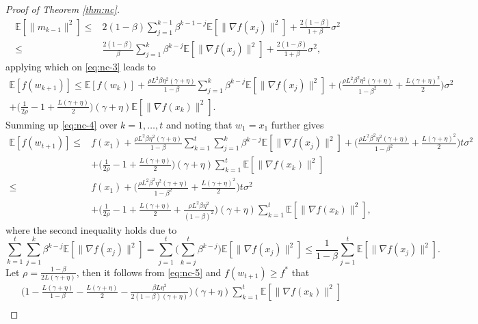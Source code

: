 \documentclass[10pt]{article}
\numberwithin{equation}{section}
\theoremstyle{definition}
\newcommand{\ebb}{\mathbb{E}}  %
\begin{document}
\begin{proof}[Proof of Theorem \ref{thm:nc}]
\begin{align*}
   \ebb[\|m_{k-1}\|^2]\leq& 2(1-\beta) \sum_{j=1}^{k-1} \beta^{k-1-j}\ebb[\|\nabla f(x_j)\|^2]+\frac{2(1-\beta)}{1+\beta} \sigma^2\\
   \leq& \frac{2(1-\beta)}{\beta}\sum_{j=1}^k \beta^{k-j}\ebb[\|\nabla f(x_j)\|^2]+\frac{2(1-\beta)}{1+\beta} \sigma^2,
\end{align*}
applying which on \eqref{eq:nc-3} leads to
\begin{multline}\label{eq:nc-4}
\ebb[f(w_{k+1})] \leq \ebb[f(w_k)]+\frac{\rho L^2 \beta \eta^2 (\gamma+\eta)}{1-\beta} \sum_{j=1}^k \beta^{k-j} \ebb[\|\nabla f(x_j)\|^2]+\Big(\frac{\rho L^2 \beta^2 \eta^2(\gamma+\eta)}{1-\beta^2}+\frac{L(\gamma+\eta)^2}{2}\Big) \sigma^2 \\
+\Big(\frac{1}{2 \rho}-1+\frac{L(\gamma+\eta)}{2}\Big)(\gamma+\eta) \ebb[\|\nabla f(x_k)\|^2].
\end{multline}
Summing up \eqref{eq:nc-4} over $k=1,\dots, t$ and noting that $w_1=x_1$ further gives
\begin{equation}\label{eq:nc-5}
\begin{aligned}
\ebb[f(w_{t+1})] \leq & f(x_1)+\frac{\rho L^2 \beta \eta^2 (\gamma+\eta)}{1-\beta}\sum_{k=1}^t\sum_{j=1}^k \beta^{k-j} \ebb[\|\nabla f(x_j)\|^2]+\Big(\frac{\rho L^2 \beta^2\eta^2 (\gamma+\eta)}{1-\beta^2}+\frac{L(\gamma+\eta)^2}{2}\Big) t \sigma^2 \\
& +\Big(\frac{1}{2 \rho}-1+\frac{L(\gamma+\eta)}{2}\Big)(\gamma+\eta) \sum_{k=1}^t \ebb[\|\nabla f(x_k)\|^2]\\
\leq & f(x_1)+\Big(\frac{\rho L^2 \beta^2\eta^2 (\gamma+\eta)}{1-\beta^2}+\frac{L(\gamma+\eta)^2}{2}\Big) t \sigma^2 \\
& +\Big(\frac{1}{2 \rho}-1+\frac{L(\gamma+\eta)}{2}+\frac{\rho L^2 \beta \eta^2}{(1-\beta)^2}\Big)(\gamma+\eta) \sum_{k=1}^t \ebb[\|\nabla f(x_k)\|^2],
\end{aligned}
\end{equation}
where the second inequality holds due to
\[
\sum_{k=1}^t\sum_{j=1}^k \beta^{k-j} \ebb[\|\nabla f(x_j)\|^2]=\sum_{j=1}^t\Big(\sum_{k=j}^t \beta^{k-j}\Big) \ebb[\|\nabla f(x_j)\|^2]\leq \frac{1}{1-\beta}\sum_{j=1}^t \ebb[\|\nabla f(x_j)\|^2].
\]
Let $\rho=\frac{1-\beta}{2 L(\gamma+\eta)}$, then it follows from \eqref{eq:nc-5} and $f(w_{t+1})\ge f^*$ that
\begin{equation}\label{eq:nc-6}
\begin{aligned}
& \Big(1-\frac{L(\gamma+\eta)}{1-\beta}-\frac{L(\gamma+\eta)}{2}-\frac{\beta L \eta^2}{2(1-\beta)(\gamma+\eta)}\Big)(\gamma+\eta) \sum_{k=1}^t \ebb[\|\nabla f(x_k)\|^2] \\

\end{aligned}
\end{equation}
\end{proof}
\end{document}
